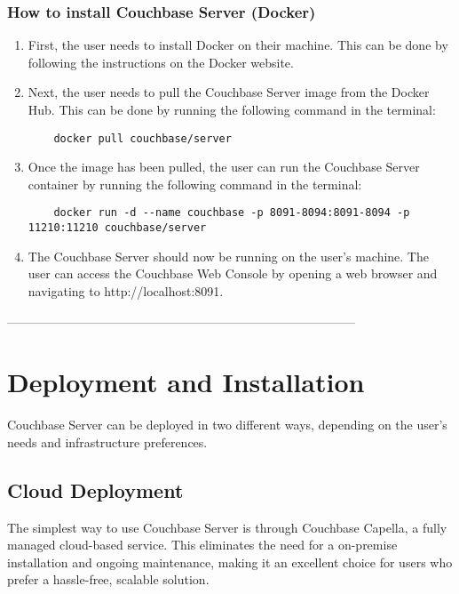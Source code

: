 \subsection{How to install Couchbase Server (Docker)}
\begin{enumerate}
    \item First, the user needs to install Docker on their machine. This can be done by following the instructions on the Docker website.
    \item Next, the user needs to pull the Couchbase Server image from the Docker Hub. This can be done by running the following command in the terminal:
    \begin{verbatim}
    docker pull couchbase/server
    \end{verbatim}
    \item Once the image has been pulled, the user can run the Couchbase Server container by running the following command in the terminal:
    \begin{verbatim}
    docker run -d --name couchbase -p 8091-8094:8091-8094 -p 11210:11210 couchbase/server
    \end{verbatim}
    \item The Couchbase Server should now be running on the user's machine. The user can access the Couchbase Web Console by opening a web browser and navigating to http://localhost:8091.
\end{enumerate}



------------------------------------------------------------------------------------





\chapter{Deployment and Installation}

Couchbase Server can be deployed in two different ways, depending on the user's needs and infrastructure preferences.

\section{Cloud Deployment}
The simplest way to use Couchbase Server is through Couchbase Capella, a fully managed cloud-based service. This eliminates the need for a on-premise installation and ongoing maintenance, making it an excellent choice for users who prefer a hassle-free, scalable solution.

